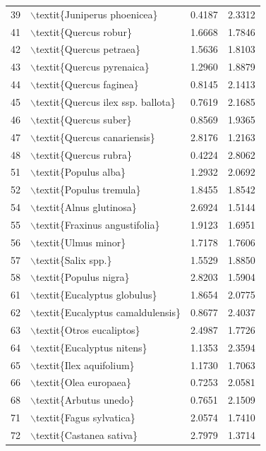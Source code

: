 \begin{table}[ht]
\begin{tabular}{llrr}
  39 & $\backslash$textit\{Juniperus phoenicea\} & 0.4187 & 2.3312 \\ 
  41 & $\backslash$textit\{Quercus robur\} & 1.6668 & 1.7846 \\ 
  42 & $\backslash$textit\{Quercus petraea\} & 1.5636 & 1.8103 \\ 
  43 & $\backslash$textit\{Quercus pyrenaica\} & 1.2960 & 1.8879 \\ 
  44 & $\backslash$textit\{Quercus faginea\} & 0.8145 & 2.1413 \\ 
  45 & $\backslash$textit\{Quercus ilex ssp. ballota\} & 0.7619 & 2.1685 \\ 
  46 & $\backslash$textit\{Quercus suber\} & 0.8569 & 1.9365 \\ 
  47 & $\backslash$textit\{Quercus canariensis\} & 2.8176 & 1.2163 \\ 
  48 & $\backslash$textit\{Quercus rubra\} & 0.4224 & 2.8062 \\ 
  51 & $\backslash$textit\{Populus alba\} & 1.2932 & 2.0692 \\ 
  52 & $\backslash$textit\{Populus tremula\} & 1.8455 & 1.8542 \\ 
  54 & $\backslash$textit\{Alnus glutinosa\} & 2.6924 & 1.5144 \\ 
  55 & $\backslash$textit\{Fraxinus angustifolia\} & 1.9123 & 1.6951 \\ 
  56 & $\backslash$textit\{Ulmus minor\} & 1.7178 & 1.7606 \\ 
  57 & $\backslash$textit\{Salix spp.\} & 1.5529 & 1.8850 \\ 
  58 & $\backslash$textit\{Populus nigra\} & 2.8203 & 1.5904 \\ 
  61 & $\backslash$textit\{Eucalyptus globulus\} & 1.8654 & 2.0775 \\ 
  62 & $\backslash$textit\{Eucalyptus camaldulensis\} & 0.8677 & 2.4037 \\ 
  63 & $\backslash$textit\{Otros eucaliptos\} & 2.4987 & 1.7726 \\ 
  64 & $\backslash$textit\{Eucalyptus nitens\} & 1.1353 & 2.3594 \\ 
  65 & $\backslash$textit\{Ilex aquifolium\} & 1.1730 & 1.7063 \\ 
  66 & $\backslash$textit\{Olea europaea\} & 0.7253 & 2.0581 \\ 
  68 & $\backslash$textit\{Arbutus unedo\} & 0.7651 & 2.1509 \\ 
  71 & $\backslash$textit\{Fagus sylvatica\} & 2.0574 & 1.7410 \\ 
  72 & $\backslash$textit\{Castanea sativa\} & 2.7979 & 1.3714 \\ 

\end{tabular}
\end{table}
